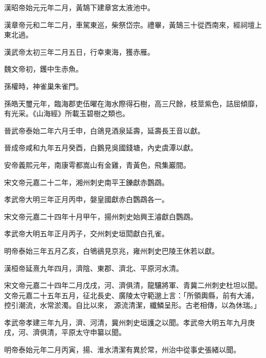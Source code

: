 \begin{pinyinscope}
 漢昭帝始元元年二月，黃鵠下建章宮太液池中。



 漢章帝元和二年二月，車駕東巡，柴祭岱宗。禮畢，黃鵠三十從西南來，經祠壇上東北過。



 漢武帝太初三年二月五日，行幸東海，獲赤雁。



 魏文帝初，鑊中生赤魚。



 孫權時，神雀巢朱雀門。



 孫皓天璽元年，臨海郡吏伍曜在海水際得石樹，高三尺餘，枝莖紫色，詰屈傾靡，有光采。《山海經》所載玉碧樹之類也。



 晉武帝泰始二年六月壬申，白鴿見酒泉延壽，延壽長王音以獻。



 晉成帝咸和九年五月癸酉，白鵝見吳國錢塘，內史虞潭以獻。



 安帝義熙元年，南康雩都嵩山有金雞，青黃色，飛集巖間。



 宋文帝元嘉二十二年，湘州刺史南平王鑠獻赤鸚鵡。



 孝武帝大明三年正月丙申，媻皇國獻赤白鸚鵡各一。



 宋文帝元嘉二十四年十月甲午，揚州刺史始興王濬獻白鸚鵡。



 孝武帝大明五年正月丙子，交州刺史垣閎獻白孔雀。



 明帝泰始三年五月乙亥，白鴝鵒見京兆，雍州刺史巴陵王休若以獻。



 漢桓帝延熹九年四月，濟陰、東郡、濟北、平原河水清。



 宋文帝元嘉二十四年二月戊戌，河、濟俱清，龍驤將軍、青冀二州刺史杜坦以聞。文帝元嘉二十五年五月，征北長史、廣陵太守範邈上言：「所領輿縣，前有大浦，控引潮流，水常淤濁。自比以來，
 源流清潔，纖鱗呈形。古老相傳，以為休瑞。」



 孝武帝孝建三年九月，濟、河清，冀州刺史垣護之以聞。孝武帝大明五年九月庚戌，河、濟俱清，平原太守申纂以聞。



 明帝泰始元年二月丙寅，揚、淮水清潔有異於常，州治中從事史張緒以聞。




\end{pinyinscope}
